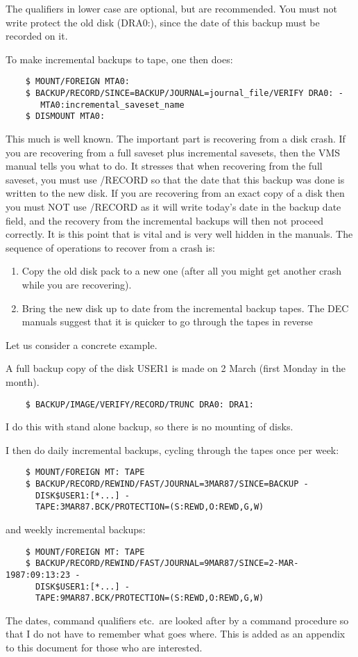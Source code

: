 The qualifiers in lower case are optional, but are recommended.
You must not write protect the old disk (DRA0:), since the date of this
backup must be recorded on it.

To make incremental backups to tape, one then does:
\begin{verbatim}
    $ MOUNT/FOREIGN MTA0:
    $ BACKUP/RECORD/SINCE=BACKUP/JOURNAL=journal_file/VERIFY DRA0: -
       MTA0:incremental_saveset_name
    $ DISMOUNT MTA0:
\end{verbatim}
This much is well known.
The important part is recovering from a disk crash.
If you are recovering from a full saveset plus incremental savesets, then
the VMS manual tells you what to do.
It stresses that when recovering from the full saveset, you must use /RECORD
so that the date that this backup was done is written to the new disk.
If you are recovering from an exact copy of a disk then you must NOT use
/RECORD as it will write today's date in the backup date field, and the
recovery from the incremental backups will then not proceed correctly.
It is this point that is vital and is very well hidden in the manuals.
The sequence of operations to recover from a crash is:
\begin{enumerate}
\item Copy the old disk pack to a new one (after all you might get another
crash while you are recovering).
\item Bring the new disk up to date from the incremental backup tapes.
The DEC manuals suggest that it is quicker to go through the tapes in reverse
\end{enumerate}
Let us consider a concrete example.

A full backup copy of the disk USER1 is made on 2 March (first Monday in the
month).
\begin{verbatim}
    $ BACKUP/IMAGE/VERIFY/RECORD/TRUNC DRA0: DRA1:
\end{verbatim}
I do this with stand alone backup, so there is no mounting of disks.

I then do daily incremental backups, cycling through the tapes once per week:
\begin{verbatim}
    $ MOUNT/FOREIGN MT: TAPE
    $ BACKUP/RECORD/REWIND/FAST/JOURNAL=3MAR87/SINCE=BACKUP -
      DISK$USER1:[*...] -
      TAPE:3MAR87.BCK/PROTECTION=(S:REWD,O:REWD,G,W)
\end{verbatim}
and weekly incremental backups:
\begin{verbatim}
    $ MOUNT/FOREIGN MT: TAPE
    $ BACKUP/RECORD/REWIND/FAST/JOURNAL=9MAR87/SINCE=2-MAR-1987:09:13:23 -
      DISK$USER1:[*...] -
      TAPE:9MAR87.BCK/PROTECTION=(S:REWD,O:REWD,G,W)
\end{verbatim}
The dates, command qualifiers etc.\ are looked after by a command procedure
so that I do not have to remember what goes where.
This is added as an appendix to this document for those who are interested.

